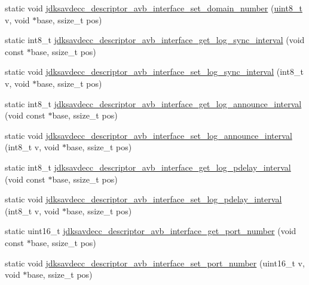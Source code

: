 \begin{DoxyCompactItemize}
static void \hyperlink{group__descriptor__avb__interface_ga8cbb9a1d823c845467459787ed0cf496}{jdksavdecc\+\_\+descriptor\+\_\+avb\+\_\+interface\+\_\+set\+\_\+domain\+\_\+number} (\hyperlink{stdint_8h_aba7bc1797add20fe3efdf37ced1182c5}{uint8\+\_\+t} v, void $\ast$base, ssize\+\_\+t pos)
\item 
static int8\+\_\+t \hyperlink{group__descriptor__avb__interface_gadf748521fd5eb6ecf9ca00a7549f297f}{jdksavdecc\+\_\+descriptor\+\_\+avb\+\_\+interface\+\_\+get\+\_\+log\+\_\+sync\+\_\+interval} (void const $\ast$base, ssize\+\_\+t pos)
\item 
static void \hyperlink{group__descriptor__avb__interface_ga94084d67afa2951894f33ccd3f286ae9}{jdksavdecc\+\_\+descriptor\+\_\+avb\+\_\+interface\+\_\+set\+\_\+log\+\_\+sync\+\_\+interval} (int8\+\_\+t v, void $\ast$base, ssize\+\_\+t pos)
\item 
static int8\+\_\+t \hyperlink{group__descriptor__avb__interface_ga780acbdef9be073b6a022925fd0db347}{jdksavdecc\+\_\+descriptor\+\_\+avb\+\_\+interface\+\_\+get\+\_\+log\+\_\+announce\+\_\+interval} (void const $\ast$base, ssize\+\_\+t pos)
\item 
static void \hyperlink{group__descriptor__avb__interface_ga25f2b3d63e3f76a8ab2a3e4d5eb5e49c}{jdksavdecc\+\_\+descriptor\+\_\+avb\+\_\+interface\+\_\+set\+\_\+log\+\_\+announce\+\_\+interval} (int8\+\_\+t v, void $\ast$base, ssize\+\_\+t pos)
\item 
static int8\+\_\+t \hyperlink{group__descriptor__avb__interface_ga309e09dd5bcb1f5357e4fae31407236b}{jdksavdecc\+\_\+descriptor\+\_\+avb\+\_\+interface\+\_\+get\+\_\+log\+\_\+pdelay\+\_\+interval} (void const $\ast$base, ssize\+\_\+t pos)
\item 
static void \hyperlink{group__descriptor__avb__interface_gae9e1e30f57877348c69324957addd1ad}{jdksavdecc\+\_\+descriptor\+\_\+avb\+\_\+interface\+\_\+set\+\_\+log\+\_\+pdelay\+\_\+interval} (int8\+\_\+t v, void $\ast$base, ssize\+\_\+t pos)
\item 
static uint16\+\_\+t \hyperlink{group__descriptor__avb__interface_ga4dbce36958084f95019db490f154a3a6}{jdksavdecc\+\_\+descriptor\+\_\+avb\+\_\+interface\+\_\+get\+\_\+port\+\_\+number} (void const $\ast$base, ssize\+\_\+t pos)
\item 
static void \hyperlink{group__descriptor__avb__interface_ga0237cacbfaaadf08e45a7e712a0fe5ba}{jdksavdecc\+\_\+descriptor\+\_\+avb\+\_\+interface\+\_\+set\+\_\+port\+\_\+number} (uint16\+\_\+t v, void $\ast$base, ssize\+\_\+t pos)
\item 

\end{DoxyCompactItemize}
